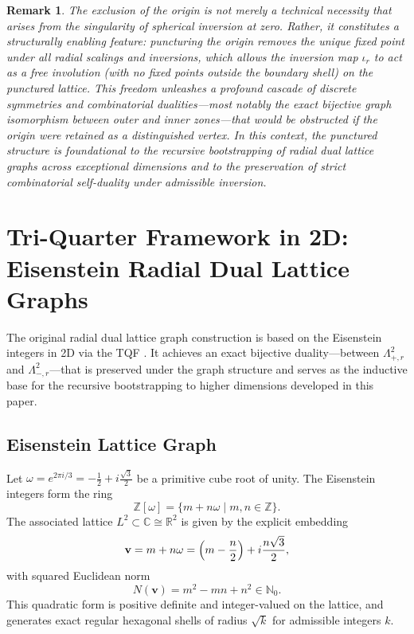 \documentclass{article}
\newtheorem{remark}{Remark}
\begin{document}
\begin{remark}
\label{rem:2d-graph-properties-2}
The exclusion of the origin is not merely a technical necessity that arises from the singularity of spherical inversion at zero. Rather, it constitutes a structurally enabling feature: puncturing the origin removes the unique fixed point under all radial scalings and inversions, which allows the inversion map $\iota_r$ to act as a free involution (with no fixed points outside the boundary shell) on the punctured lattice. This freedom unleashes a profound cascade of discrete symmetries and combinatorial dualities---most notably the exact bijective graph isomorphism between outer and inner zones---that would be obstructed if the origin were retained as a distinguished vertex. In this context, the punctured structure is foundational to the recursive bootstrapping of radial dual lattice graphs across exceptional dimensions and to the preservation of strict combinatorial self-duality under admissible inversion.
\end{remark}

\section{Tri-Quarter Framework in 2D: Eisenstein Radial Dual Lattice Graphs}
\label{sec:2d-eisenstein}

The original radial dual lattice graph construction is based on the Eisenstein integers in 2D via the TQF \cite{Schmidt2025}. It achieves an exact bijective duality---between $\Lambda_{+,r}^2$ and $\Lambda_{-,r}^2$---that is preserved under the graph structure and serves as the inductive base for the recursive bootstrapping to higher dimensions developed in this paper.

\subsection{Eisenstein Lattice Graph}
\label{subsec:2d-eisenstein-lattice}
Let $\omega = e^{2\pi i / 3} = -\frac{1}{2} + i \frac{\sqrt{3}}{2}$ be a primitive cube root of unity. The Eisenstein integers form the ring
\[
\mathbb{Z}[\omega] = \{ m + n\omega \mid m,n \in \mathbb{Z} \}.
\]
The associated lattice $L^2 \subset \mathbb{C} \cong \mathbb{R}^2$ is given by the explicit embedding
\[
\mathbf{v} = m + n\omega = \Bigl(m - \frac{n}{2}\Bigr) + i \frac{n\sqrt{3}}{2},
\]
with squared Euclidean norm
\[
N(\mathbf{v}) = m^2 - mn + n^2 \in \mathbb{N}_0.
\]
This quadratic form is positive definite and integer-valued on the lattice, and generates exact regular hexagonal shells of radius $\sqrt{k}$ for admissible integers $k$.
\end{document}
